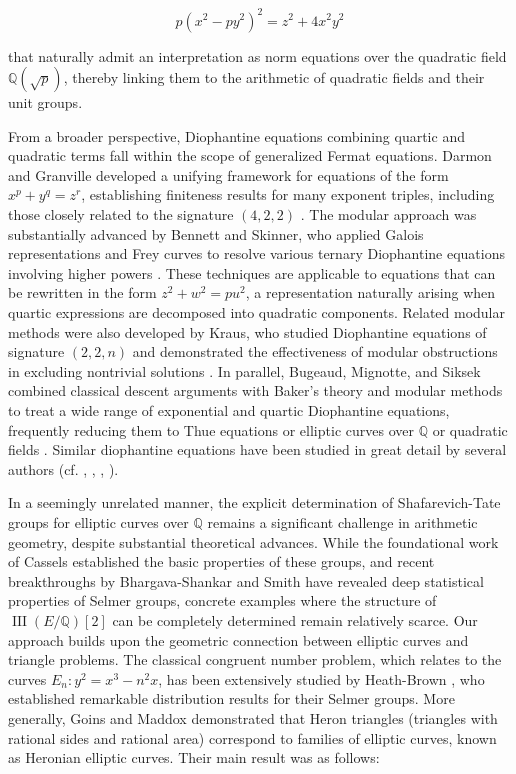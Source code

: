 \documentclass[10pt]{article}
\DeclareMathOperator{\III}{III}
\begin{document}
\[p(x^{2} - py^{2})^{2} = z^{2} + 4x^{2}y^{2}\]

that naturally admit an interpretation as norm equations over the quadratic field \(\mathbb{Q}(\sqrt{p})\), thereby linking them to the arithmetic of quadratic fields and their unit groups.

From a broader perspective, Diophantine equations combining quartic and quadratic terms fall within the scope of generalized Fermat equations. Darmon and Granville developed a unifying framework for equations of the form \(x^p + y^q = z^r\), establishing finiteness results for many exponent triples, including those closely related to the signature \((4,2,2)\) \cite{11}. The modular approach was substantially advanced by Bennett and Skinner, who applied Galois representations and Frey curves to resolve various ternary Diophantine equations involving higher powers \cite{2}. These techniques are applicable to equations that can be rewritten in the form \(z^2 + w^2 = pu^2\), a representation naturally arising when quartic expressions are decomposed into quadratic components. Related modular methods were also developed by Kraus, who studied Diophantine equations of signature \((2,2,n)\) and demonstrated the effectiveness of modular obstructions in excluding nontrivial solutions \cite{18}. In parallel, Bugeaud, Mignotte, and Siksek combined classical descent arguments with Baker's theory and modular methods to treat a wide range of exponential and quartic Diophantine equations, frequently reducing them to Thue equations or elliptic curves over \(\mathbb{Q}\) or quadratic fields \cite{3}. Similar diophantine equations have been studied in great detail by several authors (cf. \cite{11}, \cite{16}, \cite{24}, \cite{21}).

In a seemingly unrelated manner, the explicit determination of Shafarevich-Tate groups for elliptic curves over \(\mathbb{Q}\) remains a significant challenge in arithmetic geometry, despite substantial theoretical advances. While the foundational work of Cassels \cite{6} established the basic properties of these groups, and recent breakthroughs by Bhargava-Shankar \cite{4} and Smith \cite{23} have revealed deep statistical properties of Selmer groups, concrete examples where the structure of \(\III(E/\mathbb{Q})[2]\) can be completely determined remain relatively scarce. Our approach builds upon the geometric connection between elliptic curves and triangle problems. The classical congruent number problem, which relates to the curves \(E_{n}:y^{2} = x^{3} - n^{2}x\), has been extensively studied by Heath-Brown \cite{15}, who established remarkable distribution results for their Selmer groups. More generally, Goins and Maddox \cite{14} demonstrated that Heron triangles (triangles with rational sides and rational area) correspond to families of elliptic curves, known as Heronian elliptic curves. Their main result was as follows:
\end{document}

